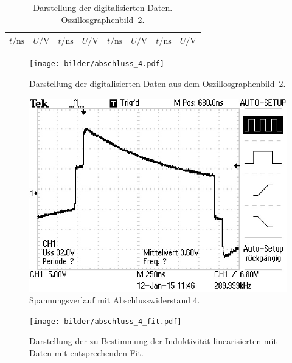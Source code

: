 \begin{table}[htpb]
  \centering
  \begin{tabular}{cc|cc|cc|cc}
    \midrule
    \midrule
    $t/\si{\nano\second}$ & $U/\si{\volt}$ &
    $t/\si{\nano\second}$ & $U/\si{\volt}$ &
    $t/\si{\nano\second}$ & $U/\si{\volt}$ &
    $t/\si{\nano\second}$ & $U/\si{\volt}$ \\
    \midrule
    
    \midrule
    \midrule
  \end{tabular}
  \caption{Darstellung der digitalisierten Daten.
    Oszillosgraphenbild~\ref{fig:abschluss_4}.}
  \label{tab:daten_abschluss_4}
\end{table}

\begin{figure}[htpb]
  \centering
  \texttt{[image: bilder/abschluss\_4.pdf]}
  \caption{Darstellung der digitalisierten Daten aus dem
    Oszillosgraphenbild~\ref{fig:abschluss_4}.}
\label{fig:abschluss_4_digitalisiert}
\end{figure}

\begin{figure}[htpb]
  \centering
  \includegraphics[scale=1.0]{bilder/abschluss/F0004TEK.JPG}
  \caption{Spannungsverlauf mit Abschlusswiderstand 4.}
  \label{fig:abschluss_4}
\end{figure}

\begin{figure}[htpb]
  \centering
  \texttt{[image: bilder/abschluss\_4\_fit.pdf]}
  \caption{Darstellung der zu Bestimmung der Induktivität
    linearisierten mit Daten mit entsprechenden Fit.}
\label{fig:abschluss_4_fit}
\end{figure}

